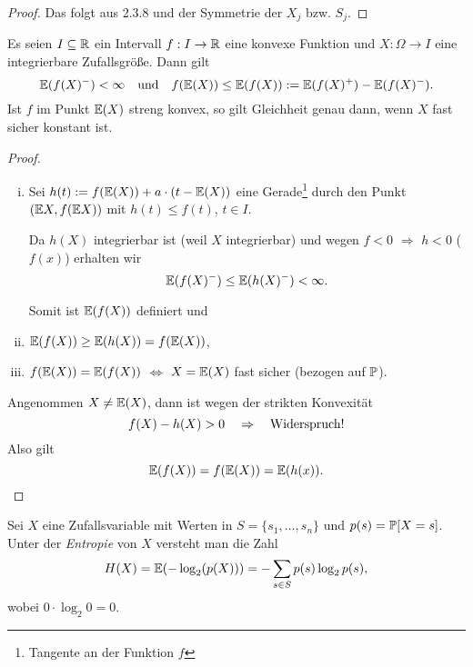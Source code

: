 \begin{proof}
  Das folgt aus 2.3.8 und der Symmetrie der $X_j$ bzw. $S_j$.
\end{proof}

\begin{thm}
  Es seien $I \subseteq \mathbb{R}$ ein Intervall $f: I \to \mathbb{R}$ eine konvexe
  Funktion und $X: \Omega \to I$ eine integrierbare Zufallsgröße\footnotemark.
  Dann gilt 
  \[ \mathbb{E}( f(X)^- ) < \infty \quad \text{und} \quad
    f(\mathbb{E}(X)) \le \mathbb{E}(f(X)) := \mathbb{E}(f(X)^+) - \mathbb{E}(f(X)^-).  \]
  Ist $f$ im Punkt $\mathbb{E}(X)$ streng konvex, so gilt Gleichheit genau dann, wenn
  $X$ fast sicher konstant ist.
\end{thm}

\begin{proof}
  \begin{enumerate}[i)]
  \item Sei $h(t) := f(\mathbb{E}(X)) + a \cdot (t - \mathbb{E}(X))$ eine Gerade\footnote{%
      Tangente an der Funktion $f$}
    durch den Punkt $(\mathbb{E} X, f(\mathbb{E} X))$ mit $h(t) \le f(t)$, $t \in I$.

    Da $h(X)$ integrierbar ist (weil $X$ integrierbar) und wegen $f < 0$
    $\Rightarrow$ $h < 0$ ($f(x)$) erhalten wir
    \[ \mathbb{E}( f(X)^-) \le \mathbb{E}(h(X)^-) < \infty. \]

    Somit ist $\mathbb{E}(f(X))$ definiert und
  \item $\mathbb{E}(f(X)) \ge \mathbb{E}(h(X)) = f(\mathbb{E}(X))$,
  \item $f(\mathbb{E}(X)) = \mathbb{E}(f(X))$ $\Leftrightarrow$ $X = \mathbb{E}(X)$ fast sicher
    (bezogen auf $\mathbb{P}$).
  \end{enumerate}
  Angenommen $X \ne \mathbb{E}(X)$, dann ist wegen der strikten Konvexität
  \[ f(X) - h(X) > 0 \quad \Rightarrow \quad \text{Widerspruch!} \]
  Also gilt
  \[ \mathbb{E}(f(X)) = f(\mathbb{E}(X)) = \mathbb{E}(h(x)). \qedhere \]
\end{proof}

\begin{defn}
  Sei $X$ eine Zufallsvariable mit Werten in $S = \{s_1, \ldots, s_n\}$ und
  $p(s) = \mathbb{P}[X=s]$. Unter der \emph{Entropie} von $X$ versteht man die Zahl
  \[ H(X) = \mathbb{E}(-\log_2(p(X))) = - \sum_{s \in S} p(s) \log_2 p(s), \]
  wobei $0 \cdot \log_2 0 = 0$.
\end{defn}